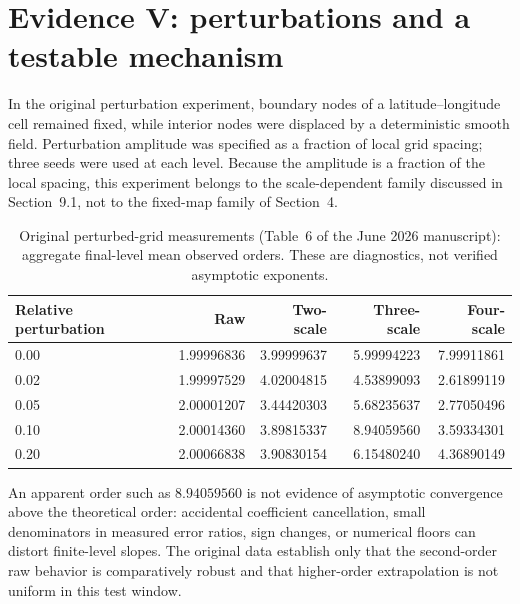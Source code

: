 \documentclass[11pt]{article}
\theoremstyle{remark}
\begin{document}
\section{Evidence V: perturbations and a testable mechanism}
In the original perturbation experiment, boundary nodes of a latitude--longitude cell remained
fixed, while interior nodes were displaced by a deterministic smooth field. Perturbation
amplitude was specified as a fraction of local grid spacing; three seeds were used at each
level.
Because the amplitude is a fraction of the local spacing, this experiment belongs to the
scale-dependent family discussed in Section~9.1, not to the fixed-map family of Section~4.

\begin{table}[ht]
\centering
\begin{tabular}{lrrrr}
\toprule
Relative perturbation & Raw & Two-scale & Three-scale & Four-scale\\
\midrule
0.00 & 1.99996836 & 3.99999637 & 5.99994223 & 7.99911861\\
0.02 & 1.99997529 & 4.02004815 & 4.53899093 & 2.61899119\\
0.05 & 2.00001207 & 3.44420303 & 5.68235637 & 2.77050496\\
0.10 & 2.00014360 & 3.89815337 & 8.94059560 & 3.59334301\\
0.20 & 2.00066838 & 3.90830154 & 6.15480240 & 4.36890149\\
\bottomrule
\end{tabular}
\caption{Original perturbed-grid measurements (Table~6 of the June 2026 manuscript):
aggregate final-level mean observed orders. These are diagnostics, not verified asymptotic
exponents.}
\end{table}

An apparent order such as $8.94059560$ is not evidence of asymptotic convergence above the
theoretical order: accidental coefficient cancellation, small denominators in measured error
ratios, sign changes, or numerical floors can distort finite-level slopes. The original data
establish only that the second-order raw behavior is comparatively robust and that
higher-order extrapolation is not uniform in this test window.
\end{document}
